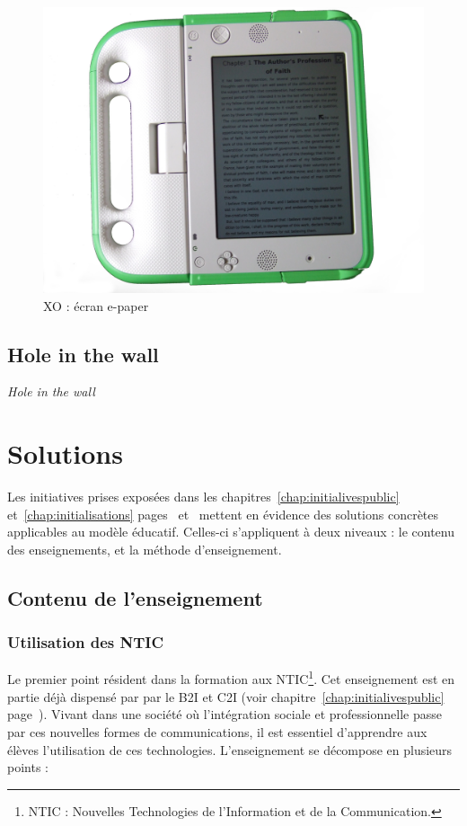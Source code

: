 \begin{minipage}{.5\linewidth}
  \begin{figure}[H]
    \includegraphics[width=\linewidth]{../resources/illustrations/olpc_display}
    \caption{XO : écran e-paper}
  \end{figure}
\end{minipage}

\section{Hole in the wall}
\textit{Hole in the wall}

\chapter{Solutions}
\label{chap:solutions}

Les initiatives prises exposées dans les chapitres~\ref{chap:initialivespublic} et~\ref{chap:initialisations} pages~\pageref{chap:initialivespublic} et~\pageref{chap:initialivespublic} mettent en évidence des solutions concrètes applicables au modèle éducatif. Celles-ci s'appliquent à deux niveaux : le contenu des enseignements, et la méthode d'enseignement.

\section{Contenu de l'enseignement}
\subsection{Utilisation des NTIC}
Le premier point résident dans la formation aux NTIC\footnote{NTIC : Nouvelles Technologies de l'Information et de la Communication.}. Cet enseignement est en partie déjà dispensé par par le B2I et C2I (voir chapitre~\ref{chap:initialivespublic} page~\pageref{chap:initialivespublic}). Vivant dans une société où l'intégration sociale et professionnelle passe par ces nouvelles formes de communications, il est essentiel d'apprendre aux élèves l'utilisation de ces technologies. L'enseignement se décompose en plusieurs points :

